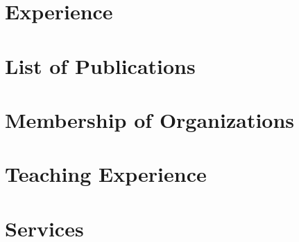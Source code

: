 \documentclass[]{res}
\begin{document}
\begin{resume}
\section{Experience}
\vspace*{0.2in} 



%


\section{List of Publications}
\vspace*{0.2in}


\section{Membership of Organizations}
\vspace*{0.2in}


\section{Teaching Experience}
\vspace*{0.2in}


\section{Services}
\vspace*{0.2in}

\end{resume}
\end{document}
